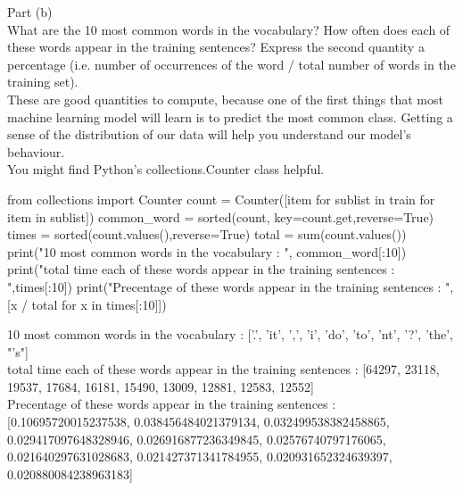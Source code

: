 \documentclass[12pt]{article}
\begin{document}
Part (b)\\
What are the 10 most common words in the vocabulary? How often does each of these words appear in the training sentences? Express the second quantity a percentage (i.e. number of occurrences of the word / total number of words in the training set).\\
These are good quantities to compute, because one of the first things that most machine learning model will learn is to predict the most common class. Getting a sense of the distribution of our data will help you understand our model's behaviour.\\
You might find Python's collections.Counter class helpful.\\
\begin{python}
from collections import Counter
count = Counter([item for sublist in train for item in sublist])
common_word = sorted(count, key=count.get,reverse=True)
times = sorted(count.values(),reverse=True)
total = sum(count.values())
print("10 most common words in the vocabulary : ", common_word[:10])
print("total time each of these words appear in the training sentences : ",times[:10])
print("Precentage of these words appear in the training sentences : ", [x / total for x in times[:10]])
\end{python}
10 most common words in the vocabulary :  ['.', 'it', ',', 'i', 'do', 'to', 'nt', '?', 'the', "'s"]\\
total time each of these words appear in the training sentences :  [64297, 23118, 19537, 17684, 16181, 15490, 13009, 12881, 12583, 12552]\\
Precentage of these words appear in the training sentences :  [0.10695720015237538, 0.038456484021379134, 0.032499538382458865, 0.029417097648328946, 0.026916877236349845, 0.02576740797176065, 0.021640297631028683, 0.021427371341784955, 0.020931652324639397, 0.020880084238963183]\\
\end{document}
